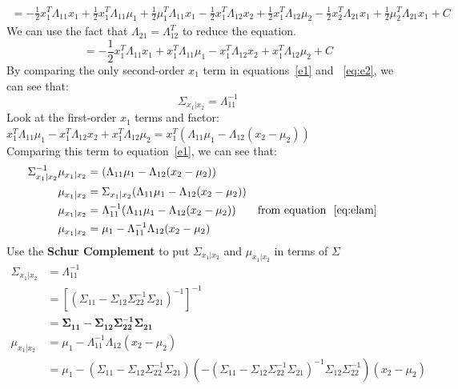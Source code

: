 \documentclass{article}
\begin{document}
\begin{enumerate}[label=(\alph*)]
\begin{multline*}
=-\frac{1}{2}x_1^T\Lambda_{11}x_1
+\frac{1}{2}x_1^T\Lambda_{11}\mu_1
+\frac{1}{2}\mu_1^T\Lambda_{11}x_1
-\frac{1}{2}x_1^T\Lambda_{12}x_2
+\frac{1}{2}x_1^T\Lambda_{12}\mu_2
-\frac{1}{2}x_2^T\Lambda_{21}x_1
+\frac{1}{2}\mu_2^T\Lambda_{21}x_1+C
\end{multline*}
We can use the fact that $\Lambda_{21}=\Lambda_{12}^T$ to reduce the equation.
\begin{equation} \label{eq:e2}
=-\frac{1}{2}x_1^T\Lambda_{11}x_1
+x_1^T\Lambda_{11}\mu_1
-x_1^T\Lambda_{12}x_2
+x_1^T\Lambda_{12}\mu_2+C
\end{equation}
By comparing the only second-order $x_1$ term in equations~\ref{e1} and ~\ref{eq:e2}, we can see
that:
\begin{equation} \label{eq:elam}
\Sigma_{x_1|x_2}=\Lambda_{11}^{-1}
\end{equation}
Look at the first-order $x_1$ terms and factor: \\
$x_1^T\Lambda_{11}\mu_1-x_1^T\Lambda_{12}x_2+x_1^T\Lambda_{12}\mu_2
=x_1^T(\Lambda_{11}\mu_1-\Lambda_{12}(x_2-\mu_2))$ \\
Comparing this term to equation~\ref{e1}, we can see that: 
\begin{align*}
\Sigma_{x_1|x_2}^{-1}\mu_{x_1|x_2}&=(\Lambda_{11}\mu_1-\Lambda_{12}(x_2-\mu_2)) \\
\mu_{x_1|x_2}&=\Sigma_{x_1|x_2}(\Lambda_{11}\mu_1-\Lambda_{12}(x_2-\mu_2)) \\
\mu_{x_1|x_2}&=\Lambda_{11}^{-1}(\Lambda_{11}\mu_1-\Lambda_{12}(x_2-\mu_2)) && \text{from equation ~\ref{eq:elam}} \\
\mu_{x_1|x_2}&=\mu_1-\Lambda_{11}^{-1}\Lambda_{12}(x_2-\mu_2)
\end{align*}
Use the \textbf{Schur Complement} to put $\Sigma_{x_1|x_2}$ and $\mu_{x_1|x_2}$ in terms of $\Sigma$
\begin{align*}
\Sigma_{x_1|x_2}&=\Lambda_{11}^{-1} \\
&=[(\Sigma_{11}-\Sigma_{12}\Sigma_{22}^{-1}\Sigma_{21})^{-1}]^{-1} \\
&\bm{=\Sigma_{11}-\Sigma_{12}\Sigma_{22}^{-1}\Sigma_{21}} \\
\mu_{x_1|x_2}&=\mu_1-\Lambda_{11}^{-1}\Lambda_{12}(x_2-\mu_2) \\
&=\mu_1-(\Sigma_{11}-\Sigma_{12}\Sigma_{22}^{-1}\Sigma_{21})
(-(\Sigma_{11}-\Sigma_{12}\Sigma_{22}^{-1}\Sigma_{21})^{-1}\Sigma_{12}\Sigma_{22}^{-1})(x_2-\mu_2)  \\

\end{align*}
\end{enumerate}
\end{document}
